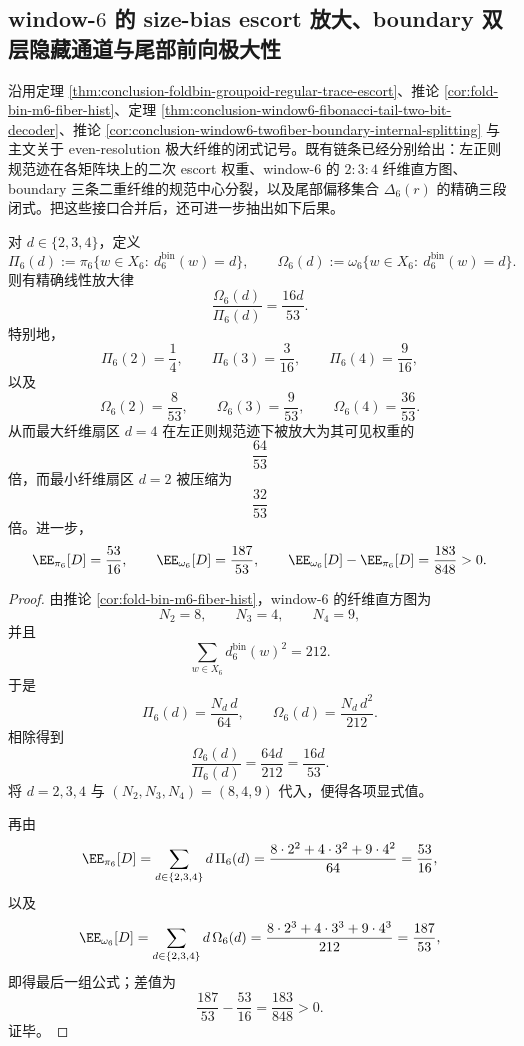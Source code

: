 \subsection{window-\texorpdfstring{$6$}{6} 的 size-bias escort 放大、boundary 双层隐藏通道与尾部前向极大性}\label{subsec:conclusion-window6-sizebias-boundary-tail-maximality}
沿用定理 \ref{thm:conclusion-foldbin-groupoid-regular-trace-escort}、推论 \ref{cor:fold-bin-m6-fiber-hist}、定理 \ref{thm:conclusion-window6-fibonacci-tail-two-bit-decoder}、推论 \ref{cor:conclusion-window6-twofiber-boundary-internal-splitting} 与主文关于 even-resolution 极大纤维的闭式记号。既有链条已经分别给出：左正则规范迹在各矩阵块上的二次 escort 权重、window-\(6\) 的 \(2{:}3{:}4\) 纤维直方图、boundary 三条二重纤维的规范中心分裂，以及尾部偏移集合 \(\Delta_6(r)\) 的精确三段闭式。把这些接口合并后，还可进一步抽出如下后果。

\begin{corollary}\label{cor:conclusion-window6-sizebias-escort-amplification}
对 \(d\in\{2,3,4\}\)，定义
\[
\Pi_6(d):=\pi_6\{w\in X_6:\ d_6^{\mathrm{bin}}(w)=d\},
\qquad
\Omega_6(d):=\omega_6\{w\in X_6:\ d_6^{\mathrm{bin}}(w)=d\}.
\]
则有精确线性放大律
\[
\frac{\Omega_6(d)}{\Pi_6(d)}=\frac{16d}{53}.
\]
特别地，
\[
\Pi_6(2)=\frac14,\qquad
\Pi_6(3)=\frac{3}{16},\qquad
\Pi_6(4)=\frac{9}{16},
\]
以及
\[
\Omega_6(2)=\frac{8}{53},\qquad
\Omega_6(3)=\frac{9}{53},\qquad
\Omega_6(4)=\frac{36}{53}.
\]
从而最大纤维扇区 \(d=4\) 在左正则规范迹下被放大为其可见权重的
\[
\frac{64}{53}
\]
倍，而最小纤维扇区 \(d=2\) 被压缩为
\[
\frac{32}{53}
\]
倍。进一步，
\[
\EE_{\pi_6}[D]=\frac{53}{16},
\qquad
\EE_{\omega_6}[D]=\frac{187}{53},
\qquad
\EE_{\omega_6}[D]-\EE_{\pi_6}[D]=\frac{183}{848}>0.
\]
\end{corollary}
\begin{proof}
由推论 \ref{cor:fold-bin-m6-fiber-hist}，window-\(6\) 的纤维直方图为
\[
N_2=8,\qquad N_3=4,\qquad N_4=9,
\]
并且
\[
\sum_{w\in X_6}d_6^{\mathrm{bin}}(w)^2=212.
\]
于是
\[
\Pi_6(d)=\frac{N_d\,d}{64},
\qquad
\Omega_6(d)=\frac{N_d\,d^2}{212}.
\]
相除得到
\[
\frac{\Omega_6(d)}{\Pi_6(d)}
=
\frac{64d}{212}
=
\frac{16d}{53}.
\]
将 \(d=2,3,4\) 与 \((N_2,N_3,N_4)=(8,4,9)\) 代入，便得各项显式值。

再由
\[
\EE_{\pi_6}[D]
=
\sum_{d\in\{2,3,4\}} d\,\Pi_6(d)
=
\frac{8\cdot 2^2+4\cdot 3^2+9\cdot 4^2}{64}
=
\frac{53}{16},
\]
以及
\[
\EE_{\omega_6}[D]
=
\sum_{d\in\{2,3,4\}} d\,\Omega_6(d)
=
\frac{8\cdot 2^3+4\cdot 3^3+9\cdot 4^3}{212}
=
\frac{187}{53},
\]
即得最后一组公式；差值为
\[
\frac{187}{53}-\frac{53}{16}
=
\frac{183}{848}>0.
\]
证毕。
\end{proof}

